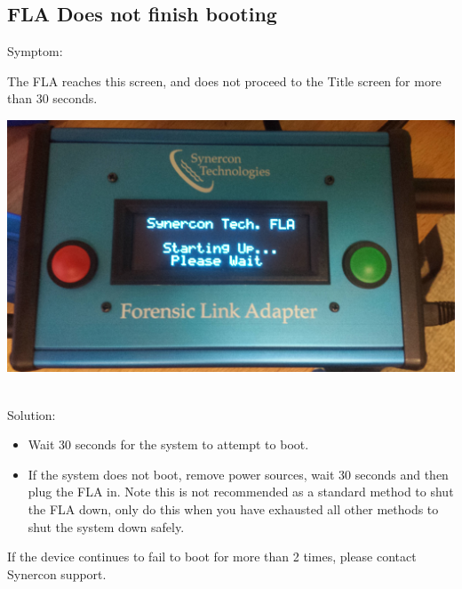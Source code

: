\documentclass[11pt]{article}
\begin{document}
\subsection{FLA Does not finish booting}
Symptom:\\
\noindent\begin{minipage}{0.45\textwidth}%
The FLA reaches this screen, and does not proceed to the Title screen for more than 30 seconds.
\end{minipage}%
\hfill%
\begin{minipage}{0.45\textwidth}
\includegraphics[width=\linewidth]{../media/fla_screens/boot_wait}
\end{minipage}\\
Solution:\\
\begin{itemize}
\item Wait 30 seconds for the system to attempt to boot.
\item If the system does not boot, remove power sources, wait 30 seconds and then plug the FLA in. Note this is not recommended as a standard method to shut the FLA down, only do this when you have exhausted all other methods to shut the system down safely.
\end{itemize}
If the device continues to fail to boot for more than 2 times, please contact Synercon support.
\end{document}

